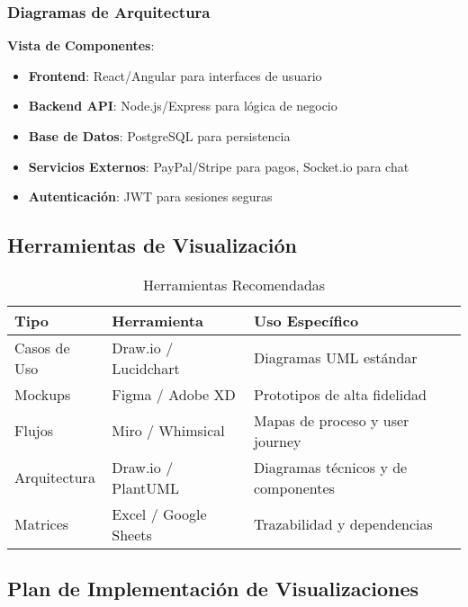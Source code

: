 \documentclass[12pt,a4paper]{article}
\begin{document}
\subsubsection{Diagramas de Arquitectura}

\textbf{Vista de Componentes}:

\begin{itemize}
    \item \textbf{Frontend}: React/Angular para interfaces de usuario
    \item \textbf{Backend API}: Node.js/Express para lógica de negocio
    \item \textbf{Base de Datos}: PostgreSQL para persistencia
    \item \textbf{Servicios Externos}: PayPal/Stripe para pagos, Socket.io para chat
    \item \textbf{Autenticación}: JWT para sesiones seguras
\end{itemize}

\subsection{Herramientas de Visualización}

\begin{table}[H]
\centering
\caption{Herramientas Recomendadas}
\begin{tabular}{|p{3cm}|p{4cm}|p{7cm}|}
\hline
\rowcolor{headercolor!30}
\textbf{\color{white}Tipo} & \textbf{\color{white}Herramienta} & \textbf{\color{white}Uso Específico} \\
\hline
Casos de Uso & Draw.io / Lucidchart & Diagramas UML estándar \\
\hline
Mockups & Figma / Adobe XD & Prototipos de alta fidelidad \\
\hline
Flujos & Miro / Whimsical & Mapas de proceso y user journey \\
\hline
Arquitectura & Draw.io / PlantUML & Diagramas técnicos y de componentes \\
\hline
Matrices & Excel / Google Sheets & Trazabilidad y dependencias \\
\hline
\end{tabular}
\end{table}

\subsection{Plan de Implementación de Visualizaciones}
\end{document}

